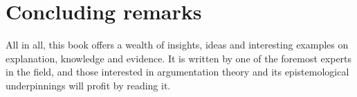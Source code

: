 \documentclass[12pt,a4paper]{article}
\begin{document}
\section{Concluding remarks}

\noindent All in all, this book offers a wealth of
insights, ideas and interesting examples on explanation, knowledge and evidence. It is written by one of the
foremost experts in the field, and those interested in argumentation
theory and its epistemological underpinnings will profit 
by reading it.



\end{document}
